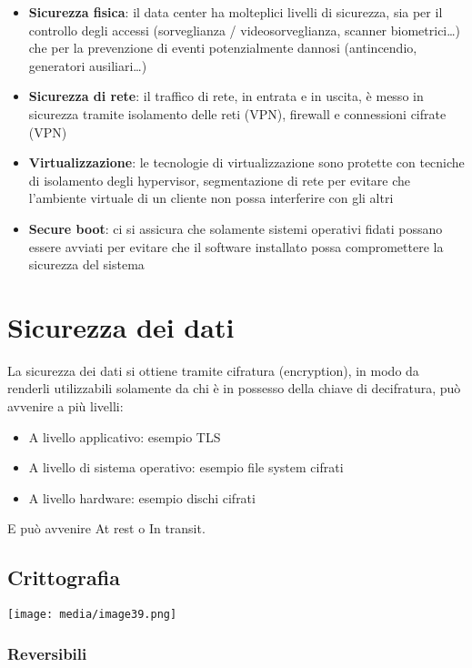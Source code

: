 \begin{itemize}
\item
  \textbf{Sicurezza fisica}: il data center ha molteplici livelli di
  sicurezza, sia per il controllo degli accessi (sorveglianza /
  videosorveglianza, scanner biometrici\ldots) che per la prevenzione di
  eventi potenzialmente dannosi (antincendio, generatori
  ausiliari\ldots)
\item
  \textbf{Sicurezza di rete}: il traffico di rete, in entrata e in
  uscita, è messo in sicurezza tramite isolamento delle reti (VPN),
  firewall e connessioni cifrate (VPN)
\item
  \textbf{Virtualizzazione}: le tecnologie di virtualizzazione sono
  protette con tecniche di isolamento degli hypervisor, segmentazione di
  rete per evitare che l'ambiente virtuale di un cliente non possa
  interferire con gli altri
\item
  \textbf{Secure boot}: ci si assicura che solamente sistemi operativi
  fidati possano essere avviati per evitare che il software installato
  possa compromettere la sicurezza del sistema
\end{itemize}

\section{Sicurezza dei dati}\label{sicurezza-dei-dati}

La sicurezza dei dati si ottiene tramite cifratura (encryption), in modo
da renderli utilizzabili solamente da chi è in possesso della chiave di
decifratura, può avvenire a più livelli:

\begin{itemize}
\item
  A livello applicativo: esempio TLS
\item
  A livello di sistema operativo: esempio file system cifrati
\item
  A livello hardware: esempio dischi cifrati
\end{itemize}

E può avvenire At rest o In transit.

\subsection{Crittografia}\label{crittografia}

\texttt{[image: media/image39.png]}

\subsubsection{Reversibili}\label{reversibili}

